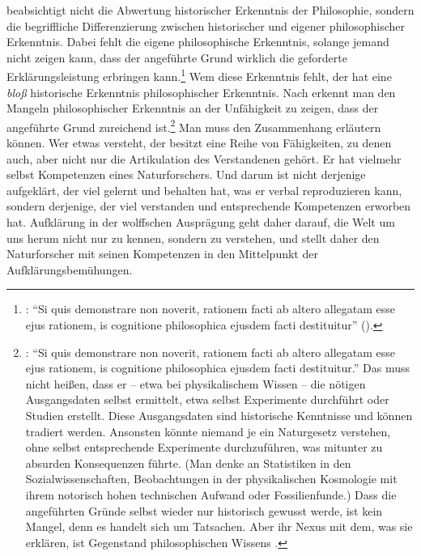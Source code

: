  beabsichtigt
nicht die Abwertung historischer Erkenntnis der Philosophie, sondern die
begriffliche Differenzierung zwischen historischer und eigener philosophischer
Erkenntnis. Dabei fehlt die eigene philosophische Erkenntnis, solange jemand
nicht zeigen kann, dass der angeführte Grund wirklich die geforderte
Erklärungsleistung erbringen
kann.\footnote{\cite[Vgl.][\S~9]{Wolff:Discursuspraeliminarisdephilosophiaingenere1996}:
\enquote{Si quis demonstrare non noverit, rationem facti ab altero allegatam
esse ejus rationem, is cognitione philosophica ejusdem facti destituitur}
(\ohio ).} Wem diese Erkenntnis fehlt, der hat eine \emph{bloß} historische
Erkenntnis philosophischer Erkenntnis. Nach
 erkennt man den Mangeln philosophischer Erkenntnis an
der Unfähigkeit zu zeigen, dass der angeführte Grund zureichend
ist.\footnote{\cite[Vgl.][\S~9]{Wolff:Discursuspraeliminarisdephilosophiaingenere1996}:
\enquote{Si quis demonstrare non noverit, rationem facti ab altero allegatam
esse ejus rationem, is cognitione philosophica ejusdem facti destituitur.} Das
muss nicht heißen, dass er -- etwa bei physikalischem Wissen -- die nötigen
Ausgangsdaten selbst ermittelt, etwa selbst Experimente durchführt oder Studien
erstellt. Diese Ausgangsdaten sind historische Kenntnisse und können tradiert
werden. Ansonsten könnte niemand je ein Naturgesetz verstehen, ohne selbst
entsprechende Experimente durchzuführen, was mitunter zu absurden Konsequenzen
führte. (Man denke an Statistiken in den Sozialwissenschaften, Beobachtungen in
der physikalischen Kosmologie mit ihrem notorisch hohen technischen Aufwand oder
Fossilienfunde.) Dass die angeführten Gründe selbst wieder nur historisch
gewusst werde, ist kein Mangel, denn es handelt sich um Tatsachen. Aber ihr
Nexus mit dem, was sie erklären, ist Gegenstand philosophischen Wissens
\parencite[vgl.][\S~10]{Wolff:Discursuspraeliminarisdephilosophiaingenere1996}.}
Man muss den Zusammenhang erläutern können. Wer etwas versteht, der besitzt eine Reihe
von Fähigkeiten, zu denen auch, aber nicht nur die Artikulation des
Verstandenen gehört. Er hat vielmehr selbst Kompetenzen eines Naturforschers.
Und darum ist nicht derjenige aufgeklärt, der viel gelernt und behalten hat, was
er verbal reproduzieren kann, sondern derjenige, der viel verstanden und
entsprechende Kompetenzen erworben hat. Aufklärung in der
wolffschen Ausprägung geht daher darauf, die Welt um uns herum
nicht nur zu kennen, sondern zu verstehen, und stellt daher den Naturforscher
mit seinen Kompetenzen in den Mittelpunkt der Aufklärungsbemühungen.



